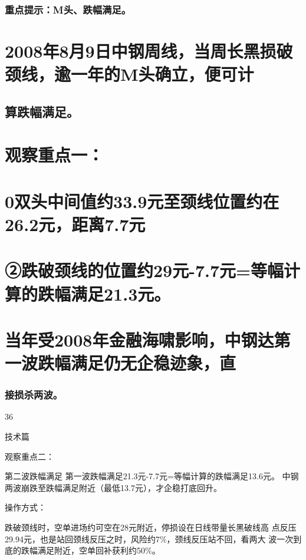 \documentclass{article}
\begin{document}
\subsubsection{重点提示：M头、跌幅满足。}

\section{2008年8月9日中钢周线，当周长黑损破颈线，逾一年的M头确立，便可计}

\subsection{算跌幅满足。}

\section{观察重点一：}

\section{0双头中间值约33.9元至颈线位置约在26.2元，距离7.7元}

\section{②跌破颈线的位置约29元-7.7元=等幅计算的跌幅满足21.3元。}

\section{当年受2008年金融海啸影响，中钢达第一波跌幅满足仍无企稳迹象，直}

\subsubsection{接损杀两波。}

36

\clearpage

技术篇

观察重点二：

第二波跌幅满足 第一波跌幅满足21.3元-7.7元=等幅计算的跌幅满足13.6元。 中钢两波崩跌至跌幅满足附近（最低13.7元），才企稳打底回升。

操作方式：

跌破颈线时，空单进场约可空在28元附近，停损设在日线带量长黑破线高 点反压29.94元，也是站回颈线反压之时，风险约7\%，颈线反压站不回，看两大 波一次到底的跌幅满足附近，空单回补获利约50\%。
\end{document}
